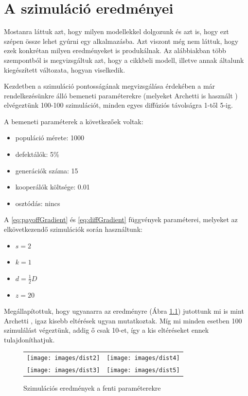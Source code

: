 
\chapter{A szimuláció eredményei}

Mostanra láttuk azt, hogy milyen modellekkel dolgozunk és azt is, hogy ezt szépen össze lehet gyúrni egy alkalmazásba. Azt viszont még nem láttuk, hogy ezek konkrétan milyen eredményeket is produkálnak. Az alábbiakban több szempontból is megvizsgáltuk azt, hogy a \cite{archetti2016cooperation} cikkbeli modell, illetve annak általunk kiegészített változata, hogyan viselkedik.

Kezdetben a szimuláció pontosságának megvizsgálása érdekében a már rendelkezésünkre álló bemeneti paraméterekre (melyeket Archetti is használt \cite{archetti2016cooperation}) elvégeztünk 100-100 szimulációt, minden egyes diffúziós távolságra 1-től 5-ig.

A bemeneti paraméterek a következőek voltak:
\begin{itemize}
	\item populáció mérete: 1000
	\item defektálók: 5\%
	\item generációk száma: 15
	\item kooperálók költsége: 0.01
	\item osztódás: nincs
\end{itemize}

A \eqref{eq:payoffGradient} és \eqref{eq:diffGradient} függvények paraméterei, melyeket az elkövetkezendő szimulációk során használtunk:
\begin{itemize}
	\item $s = 2$
	\item $k = 1$
	\item $d = \frac{1}{2}D$
	\item $z = 20$
\end{itemize}

Megállapítottuk, hogy ugyanarra az eredményre (Ábra \ref{fig:DistChange}) jutottunk mi is mint Archetti \cite{archetti2016cooperation}, igaz kisebb eltérések ugyan mutatkoztak. Míg mi minden esetben 100 szimulálást végeztünk, addig ő csak 10-et, így a kis eltéréseket ennek tulajdoníthatjuk.

\begin{figure}[ht!]
	\centering
	\begin{tabular}{cc}
		\texttt{[image: images/dist2]}
		&
		\texttt{[image: images/dist4]}
		\\
		\texttt{[image: images/dist3]}
		&
		\texttt{[image: images/dist5]}
		\\
	\end{tabular}
	\caption{Szimulációs eredmények a fenti paraméterekre}
	\label{fig:DistChange}
\end{figure}

